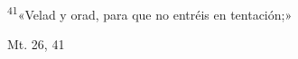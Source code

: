 \documentclass[../../rosario.tex]{subfiles}
\begin{document}
    \textsuperscript{41}«Velad y orad, para que no entréis en tentación;»
    \begin{flushright}
    Mt. 26, 41
    \end{flushright}
\end{document}
